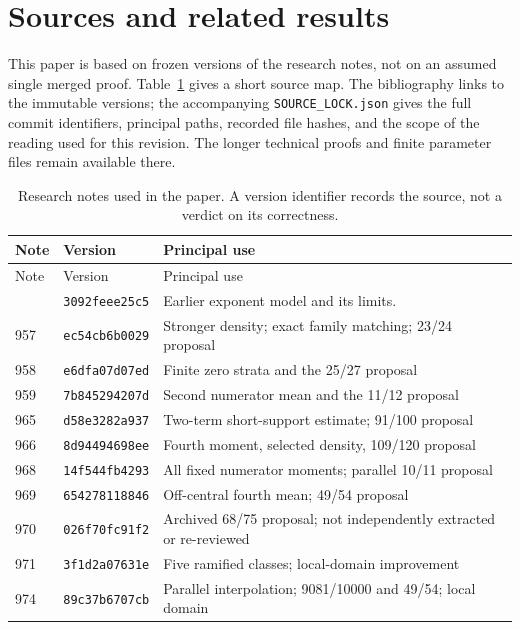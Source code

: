 \section{Sources and related results}\label{app:provenance}

This paper is based on frozen versions of the research notes, not on an assumed single merged proof. Table~\ref{tab:pins} gives a short source map. The bibliography links to the immutable versions; the accompanying \texttt{SOURCE\_LOCK.json} gives the full commit identifiers, principal paths, recorded file hashes, and the scope of the reading used for this revision. The longer technical proofs and finite parameter files remain available there.

\small
\begin{longtable}{@{}p{1.5cm}p{2.4cm}>{\raggedright\arraybackslash}p{10.7cm}@{}}
\caption{Research notes used in the paper. A version identifier records the source, not a verdict on its correctness.}\label{tab:pins}\\
\toprule Note & Version & Principal use\\
\midrule\endfirsthead
\toprule Note & Version & Principal use\\\midrule\endhead
\bottomrule\endfoot
934 & \texttt{3092feee25c5} & Earlier exponent model and its limits.\\[3pt]
957 & \texttt{ec54cb6b0029} & Stronger density; exact family matching; 23/24 proposal\\[3pt]
958 & \texttt{e6dfa07d07ed} & Finite zero strata and the 25/27 proposal\\[3pt]
959 & \texttt{7b845294207d} & Second numerator mean and the 11/12 proposal\\[3pt]
965 & \texttt{d58e3282a937} & Two-term short-support estimate; 91/100 proposal\\[3pt]
966 & \texttt{8d94494698ee} & Fourth moment, selected density, 109/120 proposal\\[3pt]
968 & \texttt{14f544fb4293} & All fixed numerator moments; parallel 10/11 proposal\\[3pt]
969 & \texttt{654278118846} & Off-central fourth mean; 49/54 proposal\\[3pt]
970 & \texttt{026f70fc91f2} & Archived 68/75 proposal; not independently extracted or re-reviewed\\[3pt]
971 & \texttt{3f1d2a07631e} & Five ramified classes; local-domain improvement\\[3pt]
974 & \texttt{89c37b6707cb} & Parallel interpolation; 9081/10000 and 49/54; local domain\\[3pt]

\end{longtable}
